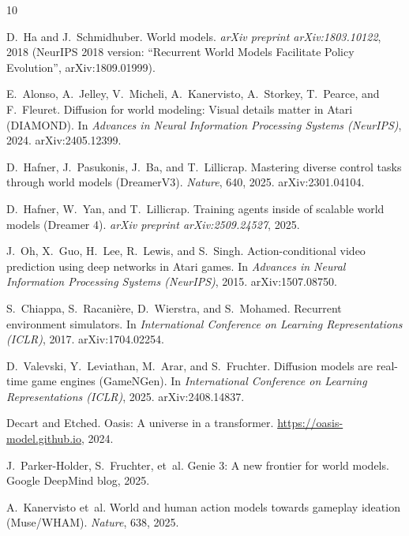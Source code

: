 \documentclass[11pt]{article}
\begin{document}

\begin{thebibliography}{10}
\small

D.~Ha and J.~Schmidhuber.
\newblock World models.
\newblock \emph{arXiv preprint arXiv:1803.10122}, 2018 (NeurIPS 2018 version: ``Recurrent World Models Facilitate Policy Evolution'', arXiv:1809.01999).

E.~Alonso, A.~Jelley, V.~Micheli, A.~Kanervisto, A.~Storkey, T.~Pearce, and F.~Fleuret.
\newblock Diffusion for world modeling: Visual details matter in Atari (DIAMOND).
\newblock In \emph{Advances in Neural Information Processing Systems (NeurIPS)}, 2024. arXiv:2405.12399.

D.~Hafner, J.~Pasukonis, J.~Ba, and T.~Lillicrap.
\newblock Mastering diverse control tasks through world models (DreamerV3).
\newblock \emph{Nature}, 640, 2025. arXiv:2301.04104.

D.~Hafner, W.~Yan, and T.~Lillicrap.
\newblock Training agents inside of scalable world models (Dreamer 4).
\newblock \emph{arXiv preprint arXiv:2509.24527}, 2025.

J.~Oh, X.~Guo, H.~Lee, R.~Lewis, and S.~Singh.
\newblock Action-conditional video prediction using deep networks in Atari games.
\newblock In \emph{Advances in Neural Information Processing Systems (NeurIPS)}, 2015. arXiv:1507.08750.

S.~Chiappa, S.~Racani\`ere, D.~Wierstra, and S.~Mohamed.
\newblock Recurrent environment simulators.
\newblock In \emph{International Conference on Learning Representations (ICLR)}, 2017. arXiv:1704.02254.

D.~Valevski, Y.~Leviathan, M.~Arar, and S.~Fruchter.
\newblock Diffusion models are real-time game engines (GameNGen).
\newblock In \emph{International Conference on Learning Representations (ICLR)}, 2025. arXiv:2408.14837.

Decart and Etched.
\newblock Oasis: A universe in a transformer.
\newblock \url{https://oasis-model.github.io}, 2024.

J.~Parker-Holder, S.~Fruchter, et~al.
\newblock Genie 3: A new frontier for world models.
\newblock Google DeepMind blog, 2025.

A.~Kanervisto et~al.
\newblock World and human action models towards gameplay ideation (Muse/WHAM).
\newblock \emph{Nature}, 638, 2025.


\end{thebibliography}
\end{document}
